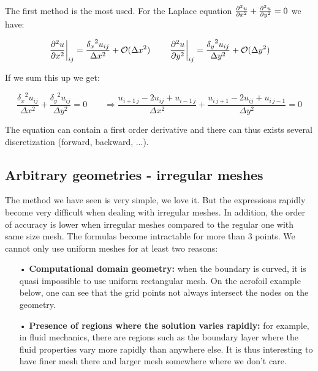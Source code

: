 The first method is the most used. For the Laplace equation $\frac{\partial ^2 u}{\partial x^2}+ \frac{\partial ^2 u}{\partial y^2} = 0$ we have: 

\begin{equation}
\left. \frac{\partial^2 u}{\partial x^2} \right|_{ij} = \frac{{\delta_x} ^2u_{ij}}{\Delta x^2} + \mathcal{O}(\Delta x^2) \qquad \left. \frac{\partial^2 u}{\partial y^2} \right|_{ij} = \frac{{\delta _y} ^2u_{ij}}{\Delta y^2} + \mathcal{O}(\Delta y^2)
\end{equation}

If we sum this up we get: 

\begin{equation}
\frac{{\delta _x} ^2u_{ij}}{\Delta x^2} + \frac{{\delta _y} ^2u_{ij}}{\Delta y^2} = 0 \qquad \Rightarrow \frac{u_{i+1 \, j} - 2u_{ij} + u_{i-1\, j}}{\Delta x ^2} + \frac{u_{i \, j+1} - 2u_{ij} + u_{i\, j-1}}{\Delta y ^2} = 0
\end{equation}

The equation can contain a first order derivative and there can thus exists several discretization (forward, backward, ...). 

\subsection{Arbitrary geometries - irregular meshes}
The method we have seen is very simple, we love it. But the expressions rapidly become very difficult when dealing with irregular meshes. In addition, the order of accuracy is lower when irregular meshes compared to the regular one with same size mesh. The formulas become intractable for more than 3 points.  We cannot only use uniform meshes for at least two reasons: \\

\begin{itemize}
\item[•] \textbf{Computational domain geometry:} when the boundary is curved, it is quasi impossible to use uniform rectangular mesh. On the aerofoil example below, one can see that the grid points not always intersect the nodes on the geometry.  
\item[•] \textbf{Presence of regions where the solution varies rapidly:} for example, in fluid mechanics, there are regions such as the boundary layer where the fluid properties vary more rapidly than anywhere else. It is thus interesting to have finer mesh there and larger mesh somewhere where we don't care. 
\end{itemize}

